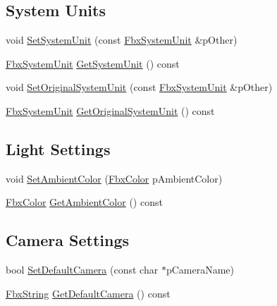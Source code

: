 \subsection*{System Units}
\begin{DoxyCompactItemize}
\item 
void \hyperlink{class_fbx_global_settings_a185096ada8b3c966f6f88d211a438952}{Set\+System\+Unit} (const \hyperlink{class_fbx_system_unit}{Fbx\+System\+Unit} \&p\+Other)
\item 
\hyperlink{class_fbx_system_unit}{Fbx\+System\+Unit} \hyperlink{class_fbx_global_settings_af7965a7917aa5a1545597e81ade9c1f0}{Get\+System\+Unit} () const
\item 
void \hyperlink{class_fbx_global_settings_ae95a4b4d7aa38f72a7fb4f7db79e65e6}{Set\+Original\+System\+Unit} (const \hyperlink{class_fbx_system_unit}{Fbx\+System\+Unit} \&p\+Other)
\item 
\hyperlink{class_fbx_system_unit}{Fbx\+System\+Unit} \hyperlink{class_fbx_global_settings_a5e52b2a7452a63b79b24aba5c7979e9a}{Get\+Original\+System\+Unit} () const
\end{DoxyCompactItemize}
\subsection*{Light Settings}
\begin{DoxyCompactItemize}
\item 
void \hyperlink{class_fbx_global_settings_a3b3673ef1dc899f098aff57042ff0eb9}{Set\+Ambient\+Color} (\hyperlink{class_fbx_color}{Fbx\+Color} p\+Ambient\+Color)
\item 
\hyperlink{class_fbx_color}{Fbx\+Color} \hyperlink{class_fbx_global_settings_ab44055e13f94e64cd39d4e35127d3ff0}{Get\+Ambient\+Color} () const
\end{DoxyCompactItemize}
\subsection*{Camera Settings}
\begin{DoxyCompactItemize}
\item 
bool \hyperlink{class_fbx_global_settings_a4aad864358aa7d13705fcef1896967ba}{Set\+Default\+Camera} (const char $\ast$p\+Camera\+Name)
\item 
\hyperlink{class_fbx_string}{Fbx\+String} \hyperlink{class_fbx_global_settings_a7a173e83989d4256dbcfc48b72c07655}{Get\+Default\+Camera} () const
\end{DoxyCompactItemize}
